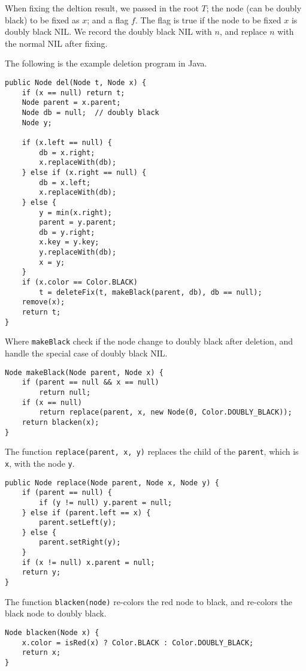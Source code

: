 \documentclass[UTF8]{article}
\begin{document}
When fixing the deltion result, we passed in the root $T$; the node (can be doubly black) to be fixed as $x$; and a flag $f$. The flag is true if the node to be fixed $x$ is doubly black NIL. We record the doubly black NIL with $n$, and replace $n$ with the normal NIL after fixing.

The following is the example deletion program in Java.

\lstset{language=Java}
\begin{lstlisting}
public Node del(Node t, Node x) {
    if (x == null) return t;
    Node parent = x.parent;
    Node db = null;  // doubly black
    Node y;

    if (x.left == null) {
        db = x.right;
        x.replaceWith(db);
    } else if (x.right == null) {
        db = x.left;
        x.replaceWith(db);
    } else {
        y = min(x.right);
        parent = y.parent;
        db = y.right;
        x.key = y.key;
        y.replaceWith(db);
        x = y;
    }
    if (x.color == Color.BLACK)
        t = deleteFix(t, makeBlack(parent, db), db == null);
    remove(x);
    return t;
}
\end{lstlisting}

Where \texttt{makeBlack} check if the node change to doubly black after deletion, and handle the special case of doubly black NIL.

\begin{lstlisting}
Node makeBlack(Node parent, Node x) {
    if (parent == null && x == null)
        return null;
    if (x == null)
        return replace(parent, x, new Node(0, Color.DOUBLY_BLACK));
    return blacken(x);
}
\end{lstlisting}

The function \texttt{replace(parent, x, y)} replaces the child of the \texttt{parent}, which is \texttt{x}, with the node \texttt{y}.

\begin{lstlisting}
public Node replace(Node parent, Node x, Node y) {
    if (parent == null) {
        if (y != null) y.parent = null;
    } else if (parent.left == x) {
        parent.setLeft(y);
    } else {
        parent.setRight(y);
    }
    if (x != null) x.parent = null;
    return y;
}
\end{lstlisting}

The function \texttt{blacken(node)} re-colors the red node to black, and re-colors the black node to doubly black.

\begin{lstlisting}
Node blacken(Node x) {
    x.color = isRed(x) ? Color.BLACK : Color.DOUBLY_BLACK;
    return x;
}
\end{lstlisting}
\end{document}
